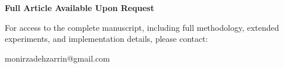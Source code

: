 \documentclass[journal]{IEEEtran}
\begin{document}
\begin{center}
{\Large \bfseries Full Article Available Upon Request}
\end{center}

\vspace{0.8em}

\begin{center}
{\normalsize
For access to the complete manuscript, including full methodology, extended experiments, and implementation details, please contact:}
\end{center}

\vspace{0.5em}

\begin{center}
{\large \ttfamily monirzadehzarrin@gmail.com}
\end{center}

\vspace{1em}
\end{document}
